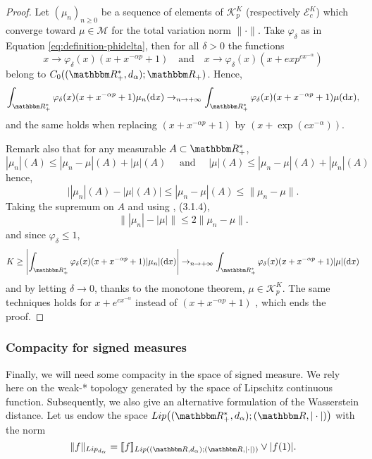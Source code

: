 \documentclass[a4paper,11pt, reqno]{amsart}
\newcommand{\cE}{\mathcal{E}}	\newcommand{\EE}{\mathbbm{E}}
\newcommand{\cK}{\mathcal{K}}	\newcommand{\KK}{\mathbbm{K}}
\newcommand{\cM}{\mathcal{M}}	\newcommand{\MM}{\mathbbm{M}}
\newcommand{\dd}{\mathop{}\!\mathrm{d}}
\newcommand{\1}{\mathbbm{1}}
\theoremstyle{plain}
\theoremstyle{definition}
\begin{document}
\begin{proof}
  Let $(\mu_n)_{n \ge 0}$ be a sequence of elements of $\cK_p^K$ (respectively $\cE^K_c$)
  which converge toward $\mu \in \cM$ for the total variation norm $\|
  \cdot \|$. Take $\varphi_{\delta}$ as in Equation \eqref{eq:definition-phidelta}, then for all $\delta > 0$ the functions
  \[ x \rightarrow \varphi_{\delta} (x) (x + x^{- \alpha p} + 1) \quad \text{and} \quad  x \rightarrow \varphi_{\delta} (x) (x + exp^{cx^{-\alpha}})\]
  belong to $ C_0
     ((\RR_+^{\ast}, d_{\alpha}) ; \RR_+) $.
  Hence,
  \[ \int_{\RR^{\ast}_+} \varphi_{\delta} (x) (x + x^{- \alpha p} + 1)
     \mu_n (\dd x) \to_{n \rightarrow + \infty}
     \int_{\RR^{\ast}_+} \varphi_{\delta} (x) (x + x^{- \alpha p} + 1)
     \mu (\dd x), \]
 and the same holds when replacing $(x+x^{-\alpha p} +1)$ by $(x + \exp(cx^{-\alpha}))$.
 
  Remark also that for any measurable $A \subset \RR_+^{\ast}$,
  \[ | \mu_n | (A) \le | \mu_n - \mu | (A) + | \mu | (A) \quad
      \text{ and } \quad | \mu | (A) \le | \mu_n - \mu | (A) + | \mu_n |
     (A) \]
  hence,
  \[ \big| | \mu_n | (A) - | \mu | (A) \big| \le | \mu_n - \mu | (A) \le
     \| \mu_n - \mu \| . \]
  Taking the supremum on $A$ and using {\cite{bogachevMeasureTheory2007}},
  (3.1.4),
  \[ \| | \mu_n | - | \mu | \| \le 2 \| \mu_n - \mu \| . \]
  and since $\varphi_{\delta} \le 1 $,
  \[ K \ge \left| \int_{\RR^{\ast}_+} \varphi_{\delta} (x) (x +
     x^{- \alpha p} + 1) | \mu_n | (\dd x) \right| \to_{n
     \rightarrow + \infty} \int_{\RR^{\ast}_+} \varphi_{\delta} (x)
     (x + x^{- \alpha p} + 1) | \mu | (\dd x) \]
  and by letting $\delta \rightarrow 0$, thanks to the monotone theorem, $\mu \in \cK_p^K$. The same techniques holds for $x+e^{cx^{-\alpha}}$ instead of $(x+x^{-\alpha p} +1)$ , which ends
  the proof.
\end{proof}

\subsubsection{Compacity for signed measures}

Finally, we will need some compacity in the space of signed measure. We rely here on the weak-* topology generated by the space of Lipschitz continuous function. Subsequently, we also give an alternative formulation of the Wasserstein distance. Let us endow the space $Lip\big((\RR_+^*,d_\alpha);(\RR,|\cdot|)\big)$ with the norm 
\[\|f\|_{Lip_{d_\alpha}} = \llbracket f \rrbracket_{Lip((\RR,d_\alpha);(\RR,|\cdot|))} \vee |f(1)|.\]
\end{document}
